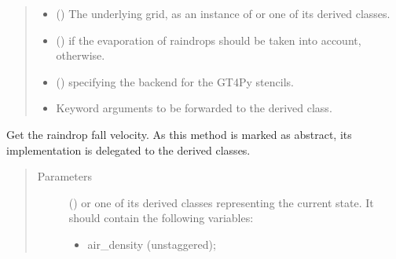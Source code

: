 \documentclass[letterpaper,10pt,english]{sphinxmanual}
\begin{document}
\begin{fulllineitems}
\begin{fulllineitems}
\begin{quote}
\begin{description}
\begin{itemize}
\item {} 
 () \textendash{} The underlying grid, as an instance of {\hyperref[\detokenize{api:grids.grid_xyz.GridXYZ}]{}} or one of its derived classes.

\item {} 
 () \textendash{}  if the evaporation of raindrops should be taken into account,  otherwise.

\item {} 
 () \textendash{}  specifying the backend for the GT4Py stencils.

\item {} 
 \textendash{} Keyword arguments to be forwarded to the derived class.

\end{itemize}

\end{description}\end{quote}

\end{fulllineitems}


\begin{fulllineitems}
\label{\detokenize{api:parameterizations.adjustments.AdjustmentMicrophysics.get_raindrop_fall_velocity}}
Get the raindrop fall velocity.
As this method is marked as abstract, its implementation is delegated to the derived classes.
\begin{quote}\begin{description}
\item[{Parameters}] \leavevmode
{} () \textendash{} 
{\hyperref[\detokenize{api:storages.grid_data.GridData}]{}} or one of its derived classes representing the current state.
It should contain the following variables:
\begin{itemize}
\item {} 
air\_density (unstaggered);


\end{itemize}
\end{description}
\end{quote}
\end{fulllineitems}
\end{fulllineitems}
\end{document}
